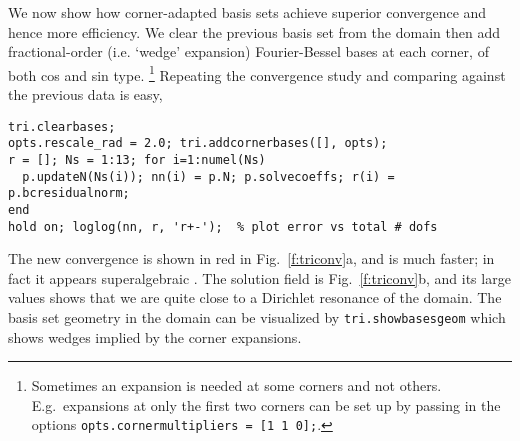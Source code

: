We now show how corner-adapted basis sets
achieve superior convergence and hence
more efficiency. We clear the previous basis set from the domain
then add fractional-order (i.e. `wedge' expansion) Fourier-Bessel bases
at each corner, of both cos and sin type.%
  \footnote{Sometimes an expansion is needed at some corners and not
    others. E.g.\ expansions at only the first two corners can be
    set up by passing in the options {\tt opts.cornermultipliers = [1 1 0];}.}
Repeating the convergence study and comparing against the previous data is easy,
\begin{verbatim}
tri.clearbases;
opts.rescale_rad = 2.0; tri.addcornerbases([], opts);
r = []; Ns = 1:13; for i=1:numel(Ns)
  p.updateN(Ns(i)); nn(i) = p.N; p.solvecoeffs; r(i) = p.bcresidualnorm;
end
hold on; loglog(nn, r, 'r+-');  % plot error vs total # dofs
\end{verbatim}
The new convergence is shown in red in Fig.~\ref{f:triconv}a,
and is much faster; in fact it appears superalgebraic \cite{timothesis}.
The solution field is Fig.~\ref{f:triconv}b, and its large values
shows that we are quite close to a Dirichlet resonance of the domain.
The basis set geometry in the domain can be visualized by
{\tt tri.showbasesgeom} which shows wedges implied by the corner
expansions.



